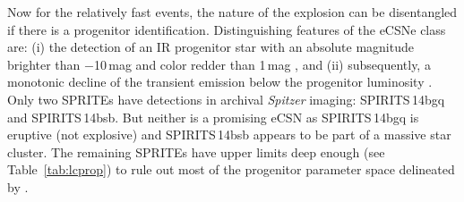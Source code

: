 \documentclass[twocolumn,times]{aastex6}
\begin{document}
Now for the relatively fast events, the nature of the explosion can be disentangled if there is a progenitor identification.
Distinguishing features of the eCSNe class are: (i) the detection of an IR progenitor
star with an absolute magnitude brighter than $-$10\,mag and color redder than 1\,mag \citep{Thompson2009, Kochanek2011}, and (ii) subsequently,
a monotonic decline of the transient emission below the progenitor luminosity \citep{Adams2016}.
Only two SPRITEs have detections in archival {\it Spitzer} imaging: SPIRITS\,14bgq and SPIRITS\,14bsb. But neither is a promising
eCSN as SPIRITS\,14bgq is eruptive (not explosive) and SPIRITS\,14bsb appears to be part of a massive star cluster.
The remaining SPRITEs have upper limits deep enough (see Table~\ref{tab:lcprop}) to rule out most of the progenitor parameter 
space delineated by \citealt{Thompson2009}.
\end{document}
